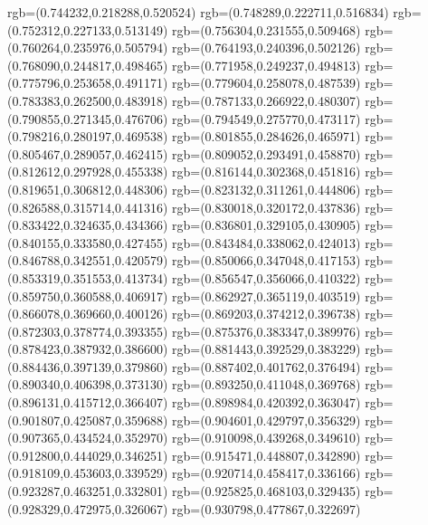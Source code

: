 {{{            rgb=(0.744232,0.218288,0.520524)
            rgb=(0.748289,0.222711,0.516834)
            rgb=(0.752312,0.227133,0.513149)
            rgb=(0.756304,0.231555,0.509468)
            rgb=(0.760264,0.235976,0.505794)
            rgb=(0.764193,0.240396,0.502126)
            rgb=(0.768090,0.244817,0.498465)
            rgb=(0.771958,0.249237,0.494813)
            rgb=(0.775796,0.253658,0.491171)
            rgb=(0.779604,0.258078,0.487539)
            rgb=(0.783383,0.262500,0.483918)
            rgb=(0.787133,0.266922,0.480307)
            rgb=(0.790855,0.271345,0.476706)
            rgb=(0.794549,0.275770,0.473117)
            rgb=(0.798216,0.280197,0.469538)
            rgb=(0.801855,0.284626,0.465971)
            rgb=(0.805467,0.289057,0.462415)
            rgb=(0.809052,0.293491,0.458870)
            rgb=(0.812612,0.297928,0.455338)
            rgb=(0.816144,0.302368,0.451816)
            rgb=(0.819651,0.306812,0.448306)
            rgb=(0.823132,0.311261,0.444806)
            rgb=(0.826588,0.315714,0.441316)
            rgb=(0.830018,0.320172,0.437836)
            rgb=(0.833422,0.324635,0.434366)
            rgb=(0.836801,0.329105,0.430905)
            rgb=(0.840155,0.333580,0.427455)
            rgb=(0.843484,0.338062,0.424013)
            rgb=(0.846788,0.342551,0.420579)
            rgb=(0.850066,0.347048,0.417153)
            rgb=(0.853319,0.351553,0.413734)
            rgb=(0.856547,0.356066,0.410322)
            rgb=(0.859750,0.360588,0.406917)
            rgb=(0.862927,0.365119,0.403519)
            rgb=(0.866078,0.369660,0.400126)
            rgb=(0.869203,0.374212,0.396738)
            rgb=(0.872303,0.378774,0.393355)
            rgb=(0.875376,0.383347,0.389976)
            rgb=(0.878423,0.387932,0.386600)
            rgb=(0.881443,0.392529,0.383229)
            rgb=(0.884436,0.397139,0.379860)
            rgb=(0.887402,0.401762,0.376494)
            rgb=(0.890340,0.406398,0.373130)
            rgb=(0.893250,0.411048,0.369768)
            rgb=(0.896131,0.415712,0.366407)
            rgb=(0.898984,0.420392,0.363047)
            rgb=(0.901807,0.425087,0.359688)
            rgb=(0.904601,0.429797,0.356329)
            rgb=(0.907365,0.434524,0.352970)
            rgb=(0.910098,0.439268,0.349610)
            rgb=(0.912800,0.444029,0.346251)
            rgb=(0.915471,0.448807,0.342890)
            rgb=(0.918109,0.453603,0.339529)
            rgb=(0.920714,0.458417,0.336166)
            rgb=(0.923287,0.463251,0.332801)
            rgb=(0.925825,0.468103,0.329435)
            rgb=(0.928329,0.472975,0.326067)
            rgb=(0.930798,0.477867,0.322697)
}}}

